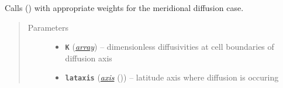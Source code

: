 \documentclass[a4paper,10pt,english]{sphinxmanual}
\begin{document}
\begin{fulllineitems}
\label{api/climlab.dynamics:climlab.dynamics.diffusion._make_meridional_diffusion_matrix}
Calls {\hyperref[api/climlab.dynamics:climlab.dynamics.diffusion._make_diffusion_matrix]{\emph{}}} () with appropriate weights for 
the meridional diffusion case.
\begin{quote}\begin{description}
\item[{Parameters}] \leavevmode\begin{itemize}
\item {} 
\textbf{\texttt{K}} (\href{http://docs.python.org/2.7/library/array.html\#module-array}{\emph{array}}) -- dimensionless diffusivities at cell boundaries
of diffusion axis 

\item {} 
\textbf{\texttt{lataxis}} ({\hyperref[api/climlab.domain:module\string-climlab.domain.axis]{\emph{\emph{axis}}}} ()) -- latitude axis where diffusion is occuring

\end{itemize}

\end{description}\end{quote}


\end{fulllineitems}
\end{document}
